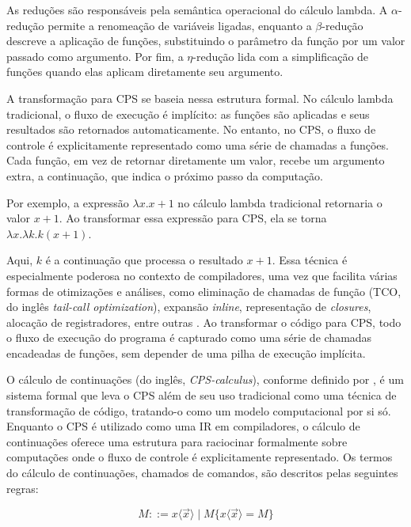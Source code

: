 As reduções são responsáveis pela semântica operacional do cálculo lambda.
A $\alpha$-redução permite a renomeação de variáveis ligadas, enquanto a $\beta$-redução descreve a aplicação de funções, substituindo o parâmetro da função por um valor passado como argumento.
Por fim, a $\eta$-redução lida com a simplificação de funções quando elas aplicam diretamente seu argumento.

A transformação para CPS se baseia nessa estrutura formal.
No cálculo lambda tradicional, o fluxo de execução é implícito: as funções são aplicadas e seus resultados são retornados automaticamente.
No entanto, no CPS, o fluxo de controle é explicitamente representado como uma série de chamadas a funções.
Cada função, em vez de retornar diretamente um valor, recebe um argumento extra, a continuação, que indica o próximo passo da computação.

Por exemplo, a expressão $\lambda x. x + 1$ no cálculo lambda tradicional retornaria o valor $x + 1$. Ao transformar essa expressão para CPS, ela se torna $\lambda x. \lambda k. k (x + 1)$.

Aqui, $k$ é a continuação que processa o resultado $x + 1$.
Essa técnica é especialmente poderosa no contexto de compiladores, uma vez que facilita várias formas de otimizações e análises, como eliminação de chamadas de função (TCO, do inglês \textit{tail-call optimization}), expansão \textit{inline}, representação de \textit{closures}, alocação de registradores, entre outras \cite{appel1992compiling}.
Ao transformar o código para CPS, todo o fluxo de execução do programa é capturado como uma série de chamadas encadeadas de funções, sem depender de uma pilha de execução implícita.


O cálculo de continuações (do inglês, \textit{CPS-calculus}), conforme definido por , é um sistema formal que leva o CPS além de seu uso tradicional como uma técnica de transformação de código, tratando-o como um modelo computacional por si só.
Enquanto o CPS é utilizado como uma IR em compiladores, o cálculo de continuações oferece uma estrutura para raciocinar formalmente sobre computações onde o fluxo de controle é explicitamente representado.
Os termos do cálculo de continuações, chamados de comandos, são descritos pelas seguintes regras:

\begin{equation}
  M ::= x\langle \vec{x} \rangle \mid M\{x\langle \vec{x} \rangle = M\}
\end{equation}

